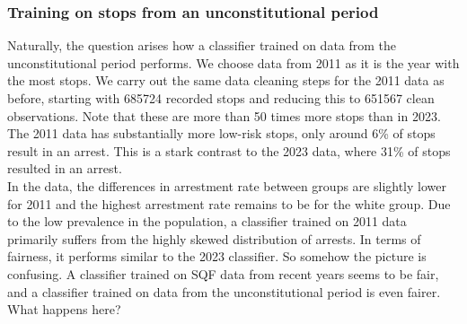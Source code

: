 \subsubsection*{Training on stops from an unconstitutional period}
Naturally, the question arises how a classifier trained on data from the unconstitutional period performs.
We choose data from 2011 as it is the year with the most stops. We carry out the same data cleaning steps for the 2011 data as before, starting with 685724 recorded stops and reducing this to 651567 clean observations. Note that these are more than 50 times more stops than in 2023.
The 2011 data has substantially more low-risk stops, only around 6\% of stops result in an arrest. This is a stark contrast to the 2023 data, where 31\% of stops resulted in an arrest.\\
In the data, the differences in arrestment rate between groups are slightly lower for 2011 and the highest arrestment rate remains to be for the white group.
Due to the low prevalence in the population, a classifier trained on 2011 data primarily suffers from the highly skewed distribution of arrests. In terms of fairness, it performs similar to the 2023 classifier.
So somehow the picture is confusing. A classifier trained on SQF data from recent years seems to be fair, and a classifier trained on data from the unconstitutional period is even fairer. What happens here?




